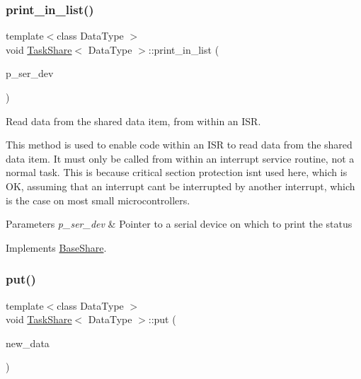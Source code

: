 \subsubsection{\texorpdfstring{print\+\_\+in\+\_\+list()}{print\_in\_list()}}
{\footnotesize\ttfamily template$<$class Data\+Type $>$ \\
void \mbox{\hyperlink{class_task_share}{Task\+Share}}$<$ Data\+Type $>$\+::print\+\_\+in\+\_\+list (\begin{DoxyParamCaption}\item[{\mbox{\hyperlink{classemstream}{emstream}} $\ast$}]{p\+\_\+ser\+\_\+dev }\end{DoxyParamCaption})\hspace{0.3cm}{\ttfamily [virtual]}}



Read data from the shared data item, from within an I\+SR. 

This method is used to enable code within an I\+SR to read data from the shared data item. It must only be called from within an interrupt service routine, not a normal task. This is because critical section protection isn\textquotesingle{}t used here, which is OK, assuming that an interrupt can\textquotesingle{}t be interrupted by another interrupt, which is the case on most small microcontrollers. 
\begin{DoxyParams}{Parameters}
{\em p\+\_\+ser\+\_\+dev} & Pointer to a serial device on which to print the status \\
\hline
\end{DoxyParams}


Implements \mbox{\hyperlink{class_base_share_a81ef685c8c1897ee316e853103e9941a}{Base\+Share}}.

\mbox{\label{class_task_share_ae1cf7a4f95975446adcfa947d9dabf82}} 
\subsubsection{\texorpdfstring{put()}{put()}}
{\footnotesize\ttfamily template$<$class Data\+Type $>$ \\
void \mbox{\hyperlink{class_task_share}{Task\+Share}}$<$ Data\+Type $>$\+::put (\begin{DoxyParamCaption}\item[{Data\+Type}]{new\+\_\+data }\end{DoxyParamCaption})\hspace{0.3cm}{\ttfamily [inline]}}



